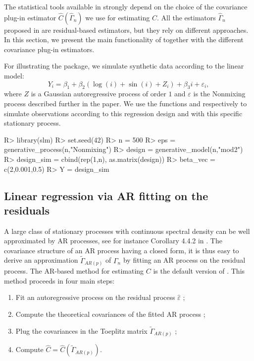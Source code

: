 The statistical tools available in  strongly depend on the choice of the covariance plug-in estimator $\widehat C (\widehat \Gamma_n)$ we use for estimating $C$. All the estimators $\widehat \Gamma_n$ proposed in  are residual-based estimators, but they rely on different approaches. In this section, we present the main functionality of  together with the different covariance plug-in estimators.

For illustrating the package, we simulate synthetic data according to the linear model:
\[Y_{i} = \beta_{1} + \beta_{2} (\log(i) + \sin(i) + Z_{i}) + \beta_{3} i + \varepsilon_{i},\]
where $Z$ is a Gaussian autoregressive process of order $1$ and $\varepsilon$ is the Nonmixing process described further in the paper.
We use the functions  and  respectively to simulate observations according to this regression design and with this specific stationary process.

\begin{Schunk}
\begin{Sinput}
R> library(slm)
R> set.seed(42)
R> n = 500
R> eps = generative_process(n,"Nonmixing")
R> design = generative_model(n,"mod2")
R> design_sim = cbind(rep(1,n), as.matrix(design))
R> beta_vec = c(2,0.001,0.5)
R> Y = design_sim %
\end{Sinput}
\end{Schunk}

\subsection{Linear regression via AR fitting on the residuals}

A large class of stationary processes with continuous spectral density can be well approximated by AR processes, see for instance Corollary 4.4.2 in \cite{brockwell1991time}. The covariance structure of an AR process having a closed form, it is thus easy to derive an approximation  $\widetilde{\Gamma}_{AR(p)}$ of $\Gamma_n$ by fitting an AR process on the residual process.
The AR-based method for estimating $C$ is the default version of \slmf.
This method proceeds in four main steps:
\begin{enumerate}
\item Fit an autoregressive process on the residual process $\hat{\varepsilon}$ ;
\item Compute the theoretical covariances of the fitted AR process ;
\item Plug the covariances in the Toeplitz matrix $\widetilde{\Gamma}_{AR(p)}$ ;
\item Compute $\widehat{C} = \widehat{C}(\widetilde{\Gamma}_{AR(p)})$.
\end{enumerate}

